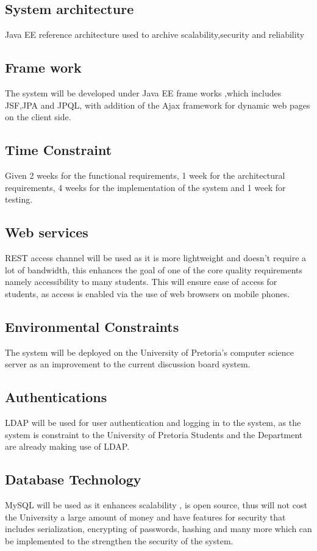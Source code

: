 \begin{flushleft}
			
\subsection*{System architecture} 
Java EE reference architecture used to archive scalability,security and reliability 

\subsection*{Frame work}
The system will be developed under Java EE frame works ,which includes JSF,JPA and JPQL, with addition of the Ajax framework for dynamic web pages on the client side.

\subsection*{Time Constraint} 
Given 2 weeks for the functional requirements, 1 week for the architectural requirements, 4 weeks for the implementation of the system and 1 week for testing.

\subsection*{Web services}
REST access channel will be used as it is more lightweight and doesn't require a lot of bandwidth, this enhances the goal of one of the core quality requirements namely accessibility to many students. This will ensure ease of access for students, as access is enabled via the use of web browsers on mobile phones.

\subsection*{Environmental Constraints}
The system will be deployed on the University of Pretoria's computer science server as an improvement to the current discussion board system.

\subsection*{Authentications}
LDAP will be used for user authentication and logging in to the system, as the system is constraint to the University of Pretoria Students and the Department are already making use of LDAP.

\subsection*{Database Technology}
MySQL will be used as it enhances scalability , is open source, thus will not cost the University a large amount of money and have features for security that includes serialization, encrypting of passwords, hashing and many more which can be implemented to the strengthen the security of the system.
		
\end{flushleft}
